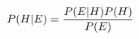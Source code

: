 \documentclass[preview]{standalone}
\begin{document}
\begin{align*}
P(H|E) = { P(E|H)P(H)  \over  P(E) }
\end{align*}
\end{document}
